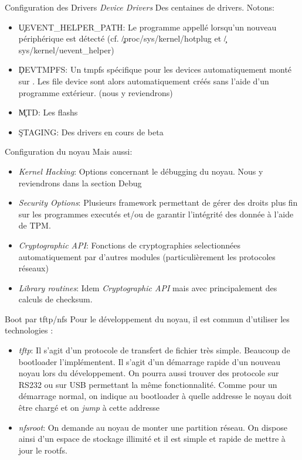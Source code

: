 \begin{frame}[fragile=singleslide]{Configuration des Drivers}
  \emph{Device Drivers} Des centaines de drivers. Notons:
  \begin{itemize}
  \item   \c{UEVENT_HELPER_PATH}:  Le  programme   appellé  lorsqu'un
    nouveau            périphérique            est           détecté
    (cf.              \c{/proc/sys/kernel/hotplug}             et
    \c{/sys/kernel/uevent_helper})
  \item   \c{DEVTMPFS}:  Un   tmpfs  spécifique   pour   les  devices
    automatiquement  monté sur  .  Les  file  device sont
    alors   automatiquement  créés   sans   l'aide  d'un   programme
    extérieur. (nous y reviendrons)
  \item \c{MTD}: Les flashs
  \item \c{STAGING}: Des drivers en cours de beta 
  \end{itemize} 
\end{frame}

\begin{frame}[fragile=singleslide]{Configuration du noyau}
  Mais aussi:
  \begin{itemize} 
  \item \emph{Kernel  Hacking}:  Options  concernant le  débugging  du
    noyau. Nous y reviendrons dans la section Debug
  \item  \emph{Security  Options}:  Plusieurs framework  permettant  de
    gérer des  droits plus  fin sur les  programmes executés  et/ou de
    garantir l'intégrité des donnée à l'aide de TPM.
  \item   \emph{Cryptographic   API}:   Fonctions   de   cryptographies
    selectionnées     automatiquement     par     d'autres     modules
    (particulièrement les protocoles réseaux)
  \item  \emph{Library routines}: Idem  \emph{Cryptographic API}  mais
    avec principalement des calculs de checksum.
  \end{itemize} 
\end{frame}

\begin{frame}[fragile=singleslide]{Boot par tftp/nfs}
  Pour le développement du noyau, il est commun d'utiliser les technologies :
  \begin{itemize} 
  \item \emph{tftp}: Il s'agit  d'un protocole de transfert de fichier
    très simple. Beaucoup de bootloader l'implémentent. Il s'agit d'un
    démarrage  rapide d'un  nouveau  noyau lors  du développement.  On
    pourra aussi trouver des protocole sur RS232 ou sur USB permettant
    la même fonctionnalité. Comme pour un démarrage normal, on indique
    au bootloader  à quelle addresse le  noyau doit être  chargé et on
    \emph{jump} à cette addresse
  \item \emph{nfsroot}:  On demande au  noyau de monter  une partition
    réseau. On  dispose ainsi d'un  espace de stockage illimité  et il
    est simple et rapide de mettre à jour le rootfs.
  \end{itemize} 
\end{frame} 

